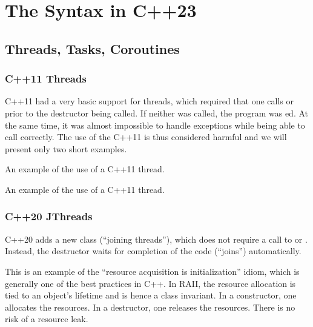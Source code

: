 \chapter{The Syntax in C++23}

\section{Threads, Tasks, Coroutines}

\subsection{C++11 Threads}

C++11 had a very basic support for threads, which required that one calls  or  prior to the destructor being called. If neither was called, the program was ed. At the same time, it was almost impossible to handle exceptions while being able to call  correctly. The use of the C++11  is thus considered harmful and we will present only two short examples.

\raggedbottom
\begin{codebox}[]{\href{https://godbolt.org/z/}{\ExternalLink}}
\footnotesize An example of the use of a C++11 thread.
\tcblower
{}
\end{codebox}

\raggedbottom
\begin{codebox}[]{\href{https://godbolt.org/z/}{\ExternalLink}}
\footnotesize An example of the use of a C++11 thread.
\tcblower
{}
\end{codebox}

\subsection{C++20 JThreads}

C++20 adds a new class  (``joining threads''), which does not require a call to  or . Instead, the destructor waits for completion of the code (``joins'') automatically. 

This is an example of the ``resource acquisition is initialization'' idiom, which is generally one of the best practices in C++. In RAII, the resource allocation is tied to an object's lifetime and is hence a class invariant. In a constructor, one allocates the resources. In a destructor, one releases the resources. There is no risk of a resource leak. 

